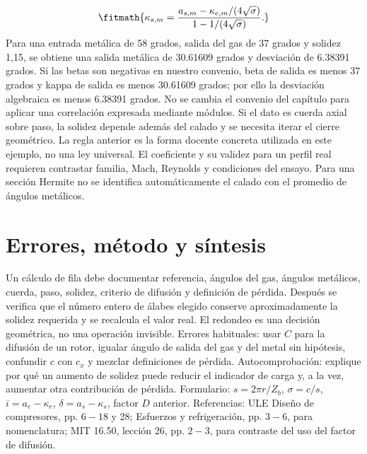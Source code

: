 \documentclass[10pt,openany]{book}
\begin{document}
\[
\fitmath{\kappa_{s,m}=\frac{a_{s,m}-\kappa_{e,m}/(4\sqrt{\sigma})}{1-1/(4\sqrt{\sigma})}.}
\]
Para una entrada metálica de 58 grados, salida del gas de 37 grados y solidez 1,15, se obtiene una salida metálica de 30.61609 grados y desviación de 6.38391 grados. Si las betas son negativas en nuestro convenio, beta de salida es menos 37 grados y kappa de salida es menos 30.61609 grados; por ello la desviación algebraica es menos 6.38391 grados. No se cambia el convenio del capítulo para aplicar una correlación expresada mediante módulos.
Si el dato es cuerda axial sobre paso, la solidez depende además del calado y se necesita iterar el cierre geométrico. La regla anterior es la forma docente concreta utilizada en este ejemplo, no una ley universal. El coeficiente y su validez para un perfil real requieren contrastar familia, Mach, Reynolds y condiciones del ensayo. Para una sección Hermite no se identifica automáticamente el calado con el promedio de ángulos metálicos.

\section{Errores, método y síntesis}

Un cálculo de fila debe documentar referencia, ángulos del gas, ángulos metálicos, cuerda, paso, solidez, criterio de difusión y definición de pérdida. Después se verifica que el número entero de álabes elegido conserve aproximadamente la solidez requerida y se recalcula el valor real. El redondeo es una decisión geométrica, no una operación invisible.
Errores habituales: usar \(C\) para la difusión de un rotor, igualar ángulo de salida del gas y del metal sin hipótesis, confundir \(c\) con \(c_x\) y mezclar definiciones de pérdida. Autocomprobación: explique por qué un aumento de solidez puede reducir el indicador de carga y, a la vez, aumentar otra contribución de pérdida.
Formulario: \(s=2\pi r/Z_b\), \(\sigma=c/s\), \(i=a_e-\kappa_e\), \(\delta=a_s-\kappa_s\), factor \(D\) anterior. Referencias: ULE Diseño de compresores, pp. \(6-18\) y 28; Esfuerzos y refrigeración, pp. \(3-6\), para nomenclatura; MIT 16.50, lección 26, pp. \(2-3\), para contraste del uso del factor de difusión.
\end{document}
